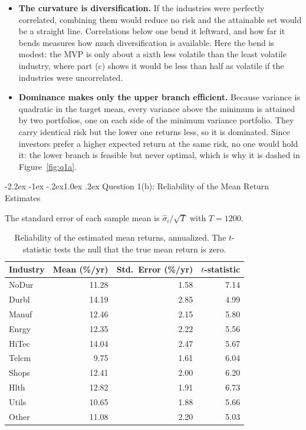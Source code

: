 \documentclass[11pt]{article}
\makeatletter
\renewcommand\subsection{\@startsection{subsection}{2}{0pt}%
  {-2.2ex \@plus -1ex \@minus -.2ex}{1.0ex \@plus .2ex}%
  {\normalfont\bfseries\normalsize\color{psink}}}
\makeatother
\begin{document}
\begin{itemize}
\setlength{\itemsep}{4pt}\setlength{\parskip}{0pt}

\item \textbf{The curvature is diversification.} If the industries were
perfectly correlated, combining them would reduce no risk and the attainable
set would be a straight line. Correlations below one bend it leftward, and how
far it bends measures how much diversification is available. Here the bend is
modest: the MVP is only about a sixth less volatile than the least volatile
industry, where part (c) shows it would be less than half as volatile if the
industries were uncorrelated.

\item \textbf{Dominance makes only the upper branch efficient.} Because
variance is quadratic in the target mean, every variance above the minimum is
attained by two portfolios, one on each side of the minimum variance
portfolio. They carry identical risk but the lower one returns less, so it is
dominated. Since investors prefer a higher expected return at the same risk,
no one would hold it: the lower branch is feasible but never optimal, which is
why it is dashed in Figure~\ref{fig:q1a}.

\end{itemize}

\subsection{Question 1(b): Reliability of the Mean Return Estimates}

The standard error of each sample mean is $\hat\sigma_i/\sqrt{T}$ with
$T = 1200$.

\begin{table}[H]
\centering
\caption{Reliability of the estimated mean returns, annualized. The
$t$-statistic tests the null that the true mean return is zero.}
\small
\begin{tabular}{lrrr}
\toprule
Industry & Mean (\%/yr) & Std.\ Error (\%/yr) & $t$-statistic \\
\midrule
NoDur & 11.28 & 1.58 & 7.14 \\
Durbl & 14.19 & 2.85 & 4.99 \\
Manuf & 12.46 & 2.15 & 5.80 \\
Enrgy & 12.35 & 2.22 & 5.56 \\
HiTec & 14.04 & 2.47 & 5.67 \\
Telcm & 9.75 & 1.61 & 6.04 \\
Shops & 12.41 & 2.00 & 6.20 \\
Hlth & 12.82 & 1.91 & 6.73 \\
Utils & 10.65 & 1.88 & 5.66 \\
Other & 11.08 & 2.20 & 5.03 \\
\bottomrule
\end{tabular}
\label{tab:q1b_rel}
\end{table}
\end{document}
